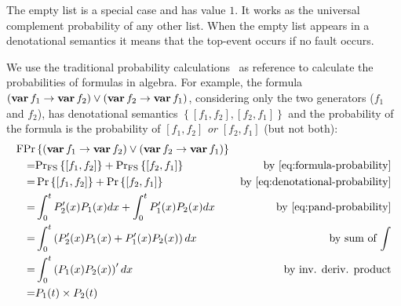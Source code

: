 The empty list is a special case and has value $1$.
It works as the universal complement probability of any other list.
When the empty list appears in a denotational semantics it means that the top-event occurs if no fault occurs.

We use the traditional probability calculations~\cite{Merle2010} as reference to calculate the probabilities of formulas in \ac{algebra}.
%
For example, the formula $\left(\operatorname{\mathbf{var}} f_1 \rightarrow \operatorname{\mathbf{var}} f_2\right) \lor \left(\operatorname{\mathbf{var}} f_2 \rightarrow \operatorname{\mathbf{var}} f_1\right)$, considering only the two generators ($f_1$ and $f_2$), has denotational semantics $\left\{\left[f_1, f_2\right], \left[f_2, f_1\right]\right\}$ and the probability of the formula is the probability of $\left[f_1, f_2\right]$ \emph{or} $\left[f_2, f_1\right]$ (but not both):
%
\begin{align}
\formulaprobop&\left\{\left(\xbefore{\var{f_1}}{\var{f_2}}\right) \lor \left(\xbefore{\var{f_2}}{\var{f_1}}\right)\right\}\nonumber\\
=&\denotationalprob{\left[f_1,f_2\right]} + \denotationalprob{\left[f_2,f_1\right]} & \text{by \cref{eq:formula-probability}} \nonumber\\
= &\probability{\left[f_1,f_2\right]} + \probability{\left[f_2,f_1\right]} & \text{by \cref{eq:denotational-probability}}\nonumber\\
=&\int_0^t P'_2(x) P_1(x) dx + \int_0^t P'_1(x) P_2(x) dx & \text{by \cref{eq:pand-probability}} \nonumber\\
= & \int_0^t \left(P'_2(x) P_1(x) + P'_1(x) P_2(x)\right) dx & \text{by sum of $\int$} \nonumber\\
= & \int_0^t \left(P_1(x) P_2(x)\right)' dx & \text{by inv. deriv. product} \nonumber\\
= & P_1(t) \times P_2(t)\label{eq:prob-xbefore-sup-equiv-inf}
\end{align}

